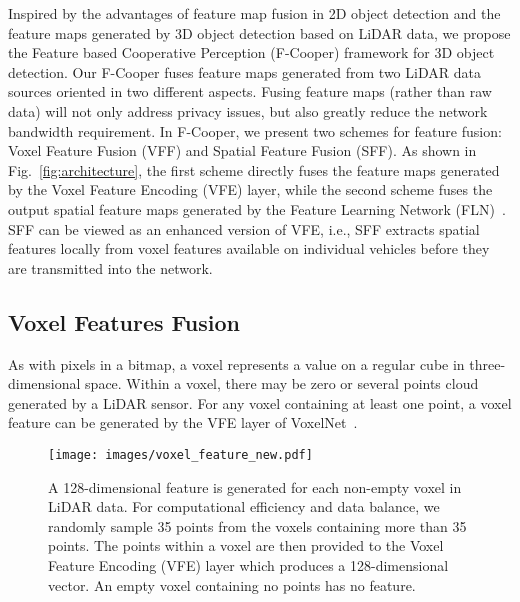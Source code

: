 \documentclass[sigconf]{acmart}
\begin{document}
Inspired by the advantages of feature map fusion in 2D object detection and the feature maps generated by 3D object detection based on LiDAR data, we propose the Feature based Cooperative Perception (F-Cooper) framework for 3D object detection. Our F-Cooper fuses feature maps generated from two LiDAR data sources oriented in two different aspects. Fusing feature maps (rather than raw data) will not only address privacy issues, but also greatly reduce the network bandwidth requirement.
In F-Cooper, we present two schemes for feature fusion: Voxel Feature Fusion (VFF) and Spatial Feature Fusion (SFF). 
As shown in Fig.~\ref{fig:architecture}, the first scheme directly fuses the feature maps generated by the Voxel Feature Encoding (VFE) layer, while the second scheme fuses the output spatial feature maps generated by the Feature Learning Network (FLN)~\cite{zhou2018voxelnet}.
SFF can be viewed as an enhanced version of VFE, i.e., SFF extracts spatial features locally from voxel features available on individual vehicles before they are transmitted into the network.








\subsection{\textbf{Voxel Features Fusion}}
As with pixels in a bitmap, a voxel represents a value on a regular cube in three-dimensional space.
Within a voxel, there may be zero or several points cloud generated by a LiDAR sensor.
For any voxel containing at least one point, a voxel feature can be generated by the VFE layer of VoxelNet~\cite{zhou2018voxelnet}.



\vspace{-11pt}
\begin{figure}[!h]
    \centering
    \texttt{[image: images/voxel\_feature\_new.pdf]}
    \vspace{-7pt}
    \caption{A 128-dimensional feature is generated for each non-empty voxel in LiDAR data. For computational efficiency and data balance, we randomly sample 35 points from the voxels containing more than 35 points. The points within a voxel are then provided to the Voxel Feature Encoding (VFE) layer which produces a 128-dimensional vector. An empty voxel containing no points has no feature.}
    \vspace{-9pt}
    \label{fig:voxel_feature_maps}
\end{figure}
\end{document}
